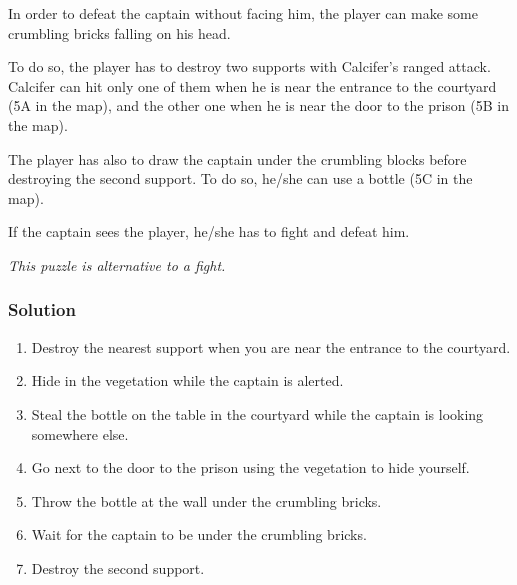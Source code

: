 In order to defeat the captain without facing him, the player can make some crumbling bricks falling on his head.

To do so, the player has to destroy two supports with Calcifer's ranged attack. Calcifer can hit only one of them when he is near the entrance to the courtyard (5A in the map), and the other one when he is near the door to the prison (5B in the map).

The player has also to draw the captain under the crumbling blocks before destroying the second support. To do so, he/she can use a bottle (5C in the map).

If the captain sees the player, he/she has to fight and defeat him.

\textit{This puzzle is alternative to a fight.}

\subsubsection*{Solution}
\begin{enumerate}
	\item Destroy the nearest support when you are near the entrance to the courtyard.
	\item Hide in the vegetation while the captain is alerted.
	\item Steal the bottle on the table in the courtyard while the captain is looking somewhere else.
	\item Go next to the door to the prison using the vegetation to hide yourself.
	\item Throw the bottle at the wall under the crumbling bricks.
	\item Wait for the captain to be under the crumbling bricks.
	\item Destroy the second support.
\end{enumerate}
